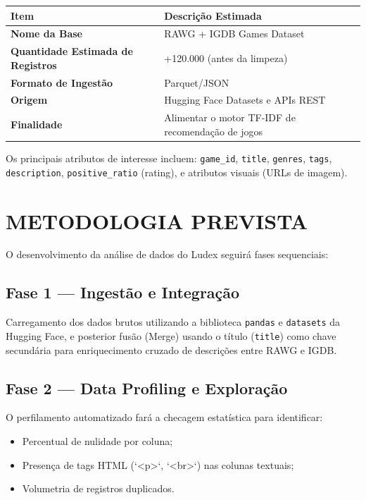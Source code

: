 \documentclass[12pt,a4paper]{article}
\begin{document}
\vspace{0.5cm}
\begin{center}
\begin{tabular}{ll}
\hline
\textbf{Item} & \textbf{Descrição Estimada} \\
\hline
\textbf{Nome da Base} & RAWG + IGDB Games Dataset \\
\textbf{Quantidade Estimada de Registros} & +120.000 (antes da limpeza) \\
\textbf{Formato de Ingestão} & Parquet/JSON \\
\textbf{Origem} & Hugging Face Datasets e APIs REST \\
\textbf{Finalidade} & Alimentar o motor TF-IDF de recomendação de jogos \\
\hline
\end{tabular}
\end{center}
\vspace{0.5cm}

Os principais atributos de interesse incluem: \texttt{game\_id}, \texttt{title}, \texttt{genres}, \texttt{tags}, \texttt{description}, \texttt{positive\_ratio} (rating), e atributos visuais (URLs de imagem).

\section{METODOLOGIA PREVISTA}
O desenvolvimento da análise de dados do Ludex seguirá fases sequenciais:

\subsection{Fase 1 --- Ingestão e Integração}
Carregamento dos dados brutos utilizando a biblioteca \texttt{pandas} e \texttt{datasets} da Hugging Face, e posterior fusão (Merge) usando o título (\texttt{title}) como chave secundária para enriquecimento cruzado de descrições entre RAWG e IGDB.

\subsection{Fase 2 --- Data Profiling e Exploração}
O perfilamento automatizado fará a checagem estatística para identificar:
\begin{itemize}
    \item Percentual de nulidade por coluna;
    \item Presença de tags HTML (`<p>`, `<br>`) nas colunas textuais;
    \item Volumetria de registros duplicados.
\end{itemize}
\end{document}
